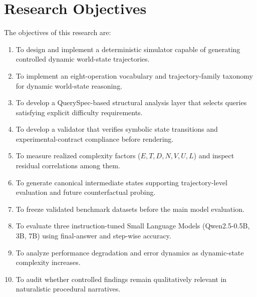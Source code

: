 \documentclass{iutbscthesis}
\begin{document}
\section{Research Objectives}
The objectives of this research are:
\begin{enumerate}[noitemsep]
    \item To design and implement a deterministic simulator capable of generating controlled dynamic world-state trajectories.
    \item To implement an eight-operation vocabulary and trajectory-family taxonomy for dynamic world-state reasoning.
    \item To develop a QuerySpec-based structural analysis layer that selects queries satisfying explicit difficulty requirements.
    \item To develop a validator that verifies symbolic state transitions and experimental-contract compliance before rendering.
    \item To measure realized complexity factors ($E,T,D,N,V,U,L$) and inspect residual correlations among them.
    \item To generate canonical intermediate states supporting trajectory-level evaluation and future counterfactual probing.
    \item To freeze validated benchmark datasets before the main model evaluation.
    \item To evaluate three instruction-tuned Small Language Models (Qwen2.5-0.5B, 3B, 7B) using final-answer and step-wise accuracy.
    \item To analyze performance degradation and error dynamics as dynamic-state complexity increases.
    \item To audit whether controlled findings remain qualitatively relevant in naturalistic procedural narratives.
\end{enumerate}
\end{document}
